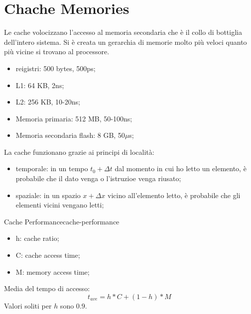 \documentclass[12pt]{article}
\begin{document}
\section{Chache Memories}
Le cache volocizzano l'accesso al memoria secondaria che \`e il collo di bottiglia dell'intero sistema. Si \`e creata un gerarchia di memorie molto pi\`u veloci quanto pi\`u vicine si trovano al processore.
\begin{itemize}
    \item reigistri: 500 bytes, 500ps;
    \item L1: 64 KB, 2ns;
    \item L2: 256 KB, 10-20ns;
    \item Memoria primaria: 512 MB, 50-100ns;
    \item Memoria secondaria flash: 8 GB, 50$\mu$s;
\end{itemize}
La cache funzionano grazie ai principi di localit\`a:
\begin{itemize}
    \item temporale: in un tempo $t_0 + \Delta t$ dal momento in cui ho letto un elemento, \`e probabile che il dato venga o l'istruzioe venga riusato;
    \item spaziale: in un spazio $x + \Delta x$ vicino all'elemento letto, \`e probabile che gli elementi vicini vengano letti;
\end{itemize}

\begin{theorem}{Cache Performance}{cache-performance}
    \begin{itemize}
        \item h: cache ratio;
        \item C: cache access time;
        \item M: memory access time;
    \end{itemize}
    Media del tempo di accesso:
    \[ t_{ave} = h * C + (1-h) * M \]
    Valori soliti per $h$ sono $0.9$.
\end{theorem}
\end{document}
